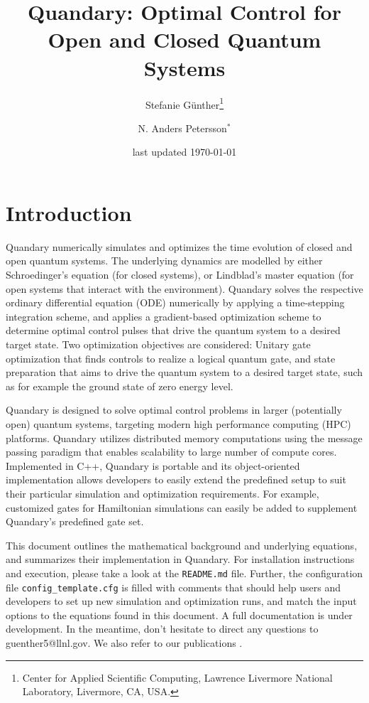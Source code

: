 \documentclass[11pt]{article}
\title{Quandary: Optimal Control for Open and Closed Quantum Systems}
\author{Stefanie G{\"u}nther\thanks{Center for Applied Scientific Computing, Lawrence Livermore National Laboratory, Livermore, CA, USA.} \and N. Anders Petersson$^*$}
\date{last updated \today}
\begin{document}
\maketitle

\tableofcontents

\section{Introduction}
Quandary numerically simulates and optimizes the time evolution of closed and open quantum systems. The
underlying dynamics are modelled by either Schroedinger's equation (for closed systems), or Lindblad's master equation (for open systems that interact with the environment). Quandary solves the respective ordinary differential equation (ODE) numerically by applying a time-stepping integration scheme, and applies a gradient-based optimization
scheme to determine optimal control pulses that drive the quantum system to a desired target state.
Two optimization objectives are considered: Unitary gate optimization that finds controls to
realize a logical quantum gate, and state preparation that aims to drive the quantum system to a desired target state, such as for example the ground state of zero energy level. 

Quandary is designed to solve optimal control problems in larger (potentially open) quantum systems, targeting modern high performance computing (HPC) platforms. Quandary utilizes distributed memory computations using the message passing paradigm that enables scalability to large number of compute cores. Implemented in C++, Quandary is portable and its object-oriented implementation allows developers to easily extend the predefined setup to suit their particular simulation and optimization requirements. For example, customized gates for Hamiltonian simulations can easily be added to supplement Quandary’s predefined gate set.

This document outlines the mathematical background and underlying equations, and summarizes their
implementation in Quandary. For installation instructions and execution, please take a
look at the \texttt{README.md} file. Further, the configuration file \texttt{config\_template.cfg} is filled with comments that should help users and developers to set up new simulation and optimization runs, and match the input options to the equations found in this document.
A full documentation is under development. In the meantime, don't
hesitate to direct any questions to guenther5@llnl.gov. 
We also refer to our publications \cite{guenther2021quandary, guenther2021quantum}.
\end{document}
